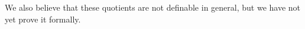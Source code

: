 We also believe that these quotients are not definable in general, but we have not yet prove it formally.















